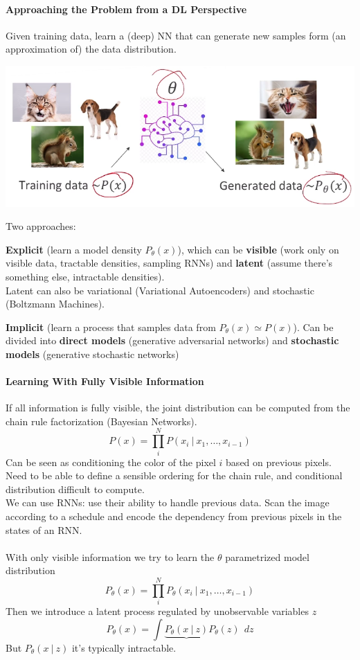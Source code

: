 \documentclass[10pt]{report}
\begin{document}
\paragraph{Approaching the Problem from a DL Perspective} Given training data, learn a (deep) NN that can generate new samples form (an approximation of) the data distribution.\begin{center}
	\includegraphics[scale=0.5]{139.png}
\end{center}
Two approaches:
\begin{list}{}{}
	\item \textbf{Explicit} (learn a model density $P_\theta(x)$), which can be \textbf{visible} (work only on visible data, tractable densities, sampling RNNs) and \textbf{latent} (assume there's something else, intractable densities).\\
	Latent can also be variational (Variational Autoencoders) and stochastic (Boltzmann Machines).
	\item \textbf{Implicit} (learn a process that samples data from $P_\theta(x)\simeq P(x)$). Can be divided into \textbf{direct models} (generative adversarial networks) and \textbf{stochastic models} (generative stochastic networks)
\end{list}
\paragraph{Learning With Fully Visible Information} If all information is fully visible, the joint distribution can be computed from the chain rule factorization (Bayesian Networks).
$$P(x)=\prod_i^NP(x_i\:|\:x_1,\ldots,x_{i-1})$$
Can be seen as conditioning the color of the pixel $i$ based on previous pixels. Need to be able to define a sensible ordering for the chain rule, and conditional distribution difficult to compute.\\
We can use RNNs: use their ability to handle previous data. Scan the image according to a schedule and encode the dependency from previous pixels in the states of an RNN.\\\\
With only visible information we try to learn the $\theta$ parametrized model distribution
$$P_\theta(x)=\prod_i^NP_\theta(x_i\:|\:x_1,\ldots,x_{i-1})$$
Then we introduce a latent process regulated by unobservable variables $z$
$$P_\theta(x)=\int \underbrace{P_\theta(x\:|\:z)} P_\theta(z)\:\:dz$$
But $P_\theta(x\:|\:z)$ it's typically intractable.
\end{document}
